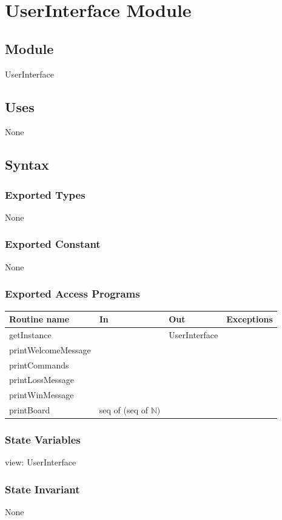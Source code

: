 \documentclass[12pt]{article}
\begin{document}
\newpage

\section* {UserInterface Module}

\subsection*{Module}
UserInterface

\subsection* {Uses}
None
\subsection* {Syntax}
\subsubsection* {Exported Types}
None
\subsubsection* {Exported Constant}
None
\subsubsection* {Exported Access Programs}
\begin{tabular}{| l | l | l | l |}
\hline
\textbf{Routine name} & \textbf{In} & \textbf{Out} & \textbf{Exceptions}\\
\hline
getInstance &  & UserInterface & \\
\hline
printWelcomeMessage &  &  & \\
\hline
printCommands &  &  & \\
\hline
printLossMessage &  &  & \\
\hline
printWinMessage &  &  & \\
\hline
printBoard & seq of (seq of $\mathbb{N})$ &  & \\
\hline
\end{tabular}

\subsubsection* {State Variables}
view: UserInterface

\subsubsection* {State Invariant}
None
\end{document}
